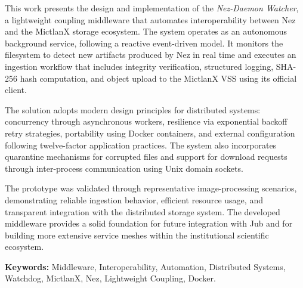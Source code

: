 \documentclass[12pt]{article}
\begin{document}
This work presents the design and implementation of the \textit{Nez-Daemon Watcher}, a lightweight coupling middleware that automates interoperability between Nez and the MictlanX storage ecosystem. The system operates as an autonomous background service, following a reactive event-driven model. It monitors the filesystem to detect new artifacts produced by Nez in real time and executes an ingestion workflow that includes integrity verification, structured logging, SHA-256 hash computation, and object upload to the MictlanX VSS using its official client.

The solution adopts modern design principles for distributed systems: concurrency through asynchronous workers, resilience via exponential backoff retry strategies, portability using Docker containers, and external configuration following twelve-factor application practices. The system also incorporates quarantine mechanisms for corrupted files and support for download requests through inter-process communication using Unix domain sockets.

The prototype was validated through representative image-processing scenarios, demonstrating reliable ingestion behavior, efficient resource usage, and transparent integration with the distributed storage system. The developed middleware provides a solid foundation for future integration with Jub and for building more extensive service meshes within the institutional scientific ecosystem.

\textbf{Keywords:} Middleware, Interoperability, Automation, Distributed Systems, Watchdog, MictlanX, Nez, Lightweight Coupling, Docker.



\clearpage
{}
\renewcommand\contentsname{Índice}
\tableofcontents



\clearpage
{}
\setcounter{page}{1}
%

\clearpage
%

\clearpage


\clearpage


\clearpage

\end{document}
